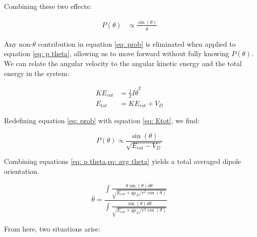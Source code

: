 Combining these two effects:

\begin{align}
    P(\theta) & \propto \frac{\sin(\theta)}{\dot{\theta}} \label{eq: prob}
\end{align}

Any non-$\theta$ contribution in equation \ref{eq: prob} is eliminated when applied to equation \ref{eq: p theta}, allowing us to move forward without fully knowing $P(\theta)$. We can relate the angular velocity to the angular kinetic energy and the total energy in the system:

\begin{align}
    KE_{rot} & = \frac{1}{2}I\dot{\theta}^2 \nonumber \\
    E_{tot} & = KE_{rot} + V_D \label{eq: Etot}
\end{align}

Redefining equation \ref{eq: prob} with equation \ref{eq: Etot}, we find:

\begin{equation}
    P(\theta) \propto \frac{\sin(\theta)}{\sqrt{E_{rot}-V_D}} \label{eq: p theta}
\end{equation}

Combining equations \cref{eq: p theta,eq: avg theta} yields a total averaged dipole orientation.

\begin{equation}
    \bar{\theta} = \dfrac{\displaystyle \int\frac{\theta \sin(\theta)d\theta}{\sqrt{E_{rot}+q\mu_D/r^2 \cos(\theta)}}}{\displaystyle \int\frac{\sin(\theta)d\theta}{\sqrt{E_{rot}+q\mu_D/r^2 \cos(\theta)}}} \label{eq: avg theta int}
\end{equation}

From here, two situations arise:


